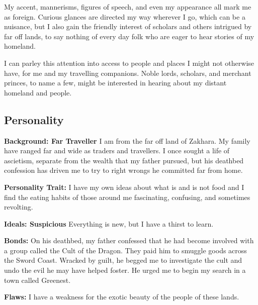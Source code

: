 \documentclass[letterpaper,10pt,twoside,twocolumn,openany]{book}
\begin{document}
\begin{specialability}
  My accent, mannerisms, figures of speech, and even my appearance all mark me as foreign. Curious glances are directed my way wherever I go, which can be a nuisance, but I also gain the friendly interest of scholars and others intrigued by far off lands, to say nothing of every day folk who are eager to hear stories of my homeland.

  I can parley this attention into access to people and places I might not otherwise have, for me and my travelling companions. Noble lords, scholars, and merchant princes, to name a few, might be interested in hearing about my distant homeland and people.
\end{specialability}

\subsection{Personality}

\textbf{Background: Far Traveller} I am from the far off land of Zakhara. My family have ranged far and wide as traders and travellers. I once sought a life of ascietism, separate from the wealth that my father pursued, but his deathbed confession has driven me to try to right wrongs he committed far from home.

\textbf{Personality Trait:} I have my own ideas about what is and is not food and I find the eating habits of those around me fascinating, confusing, and sometimes revolting.

\textbf{Ideals: Suspicious} Everything is new, but I have a thirst to learn.

\textbf{Bonds:} On his deathbed, my father confessed that he had become involved with a group called the Cult of the Dragon. They paid him to smuggle goods across the Sword Coast. Wracked by guilt, he begged me to investigate the cult and undo the evil he may have helped foster. He urged me to begin my search in a town called Greenest.

\textbf{Flaws:} I have a weakness for the exotic beauty of the people of these lands.
\end{document}

